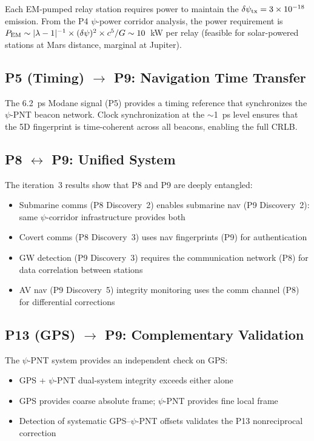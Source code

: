\documentclass[aps,prd,twocolumn,superscriptaddress,nofootinbib]{revtex4-2}
\begin{document}
Each EM-pumped relay station requires power to maintain the
$\delta\psi_{\rm tx} = 3\times10^{-18}$ emission.  From the P4
$\psi$-power corridor analysis, the power requirement is
$P_{\rm EM} \sim |\lambda-1|^{-1}\times(\delta\psi)^2\times c^5/G
\sim 10$~kW per relay (feasible for solar-powered stations at
Mars distance, marginal at Jupiter).

\subsection{P5 (Timing) $\to$ P9: Navigation Time Transfer}

The 6.2~ps Modane signal (P5) provides a timing reference that
synchronizes the $\psi$-PNT beacon network.  Clock synchronization
at the $\sim$1~ps level ensures that the 5D fingerprint is
time-coherent across all beacons, enabling the full CRLB.

\subsection{P8 $\leftrightarrow$ P9: Unified System}

The iteration~3 results show that P8 and P9 are deeply entangled:
\begin{itemize}
\item Submarine comms (P8 Discovery~2) enables submarine nav (P9
Discovery~2): same $\psi$-corridor infrastructure provides both
\item Covert comms (P8 Discovery~3) uses nav fingerprints (P9)
for authentication
\item GW detection (P9 Discovery~3) requires the communication
network (P8) for data correlation between stations
\item AV nav (P9 Discovery~5) integrity monitoring uses the
comm channel (P8) for differential corrections
\end{itemize}

\subsection{P13 (GPS) $\to$ P9: Complementary Validation}

The $\psi$-PNT system provides an independent check on GPS:
\begin{itemize}
\item GPS + $\psi$-PNT dual-system integrity exceeds either alone
\item GPS provides coarse absolute frame; $\psi$-PNT provides fine
local frame
\item Detection of systematic GPS--$\psi$-PNT offsets validates
the P13 nonreciprocal correction
\end{itemize}
\end{document}
